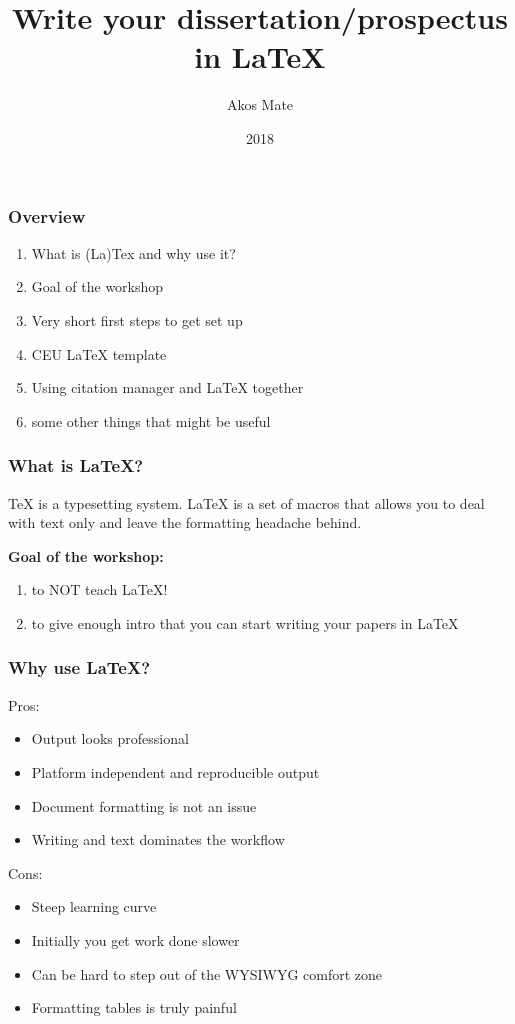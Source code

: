 \documentclass{beamer}
\title{Write your dissertation/prospectus in LaTeX}
\author{Akos Mate}
\institute{CEU - PERG Workshop}
\date{2018}
\begin{document}
\frame{\titlepage}

\begin{frame}
	\frametitle{Overview}
	\begin{enumerate}
		\item What is (La)Tex and why use it?
		\item Goal of the workshop
		\item Very short first steps to get set up
		\item CEU LaTeX template
		\item Using citation manager and LaTeX together
		\item some other things that might be useful
	\end{enumerate}
\end{frame}


\begin{frame}
\frametitle{What is LaTeX?}
	TeX is a typesetting system. LaTeX is a set of macros that allows you to deal with text only and leave the formatting headache behind. \pause
	\bigskip

	\textbf{Goal of the workshop:} \pause
	\begin{enumerate}
	\item to NOT teach LaTeX! \pause
	\item to give enough intro that you can start writing your papers in LaTeX
	\end{enumerate}
\end{frame}


\begin{frame}
	\frametitle{Why use LaTeX?}
	Pros:
	\begin{itemize}
		\item Output looks professional \pause
		\item Platform independent and reproducible output \pause
		\item Document formatting is not an issue \pause
		\item Writing and text dominates the workflow \pause
	\end{itemize}
	\medskip

	Cons:
	\begin{itemize}
		\item Steep learning curve \pause
		\item Initially you get work done slower \pause
		\item Can be hard to step out of the WYSIWYG comfort zone \pause
		\item Formatting tables is truly painful
	\end{itemize}
\end{frame}
\end{document}
